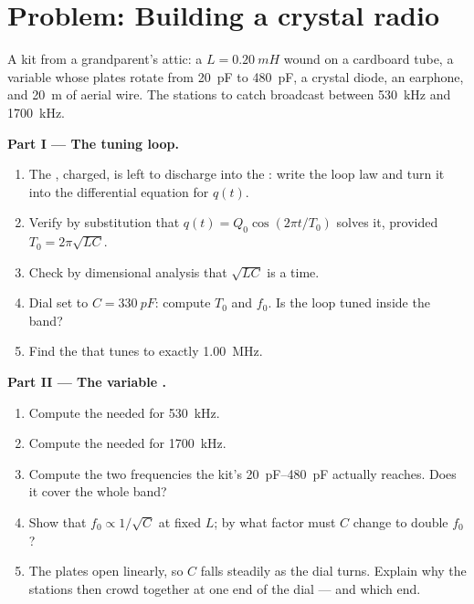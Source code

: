 \section{Problem: Building a crystal radio}

\begin{problem}
\label{pb:g12:rlc-oscillations:1}
A kit from a grandparent's attic: a  $L = \qty{0.20}{mH}$ wound on
a cardboard tube, a variable  whose plates rotate from
\qty{20}{pF} to \qty{480}{pF}, a crystal diode, an earphone, and
\qty{20}{m} of aerial wire. The stations to catch broadcast between
\qty{530}{kHz} and \qty{1700}{kHz}.

\medskip
\noindent\textbf{Part I --- The tuning loop.}
\begin{enumerate}
  \item The , charged, is left to discharge into the :
        write the loop law and turn it into the differential equation
        for $q(t)$.
  \item Verify by substitution that $q(t) = Q_0\cos(2\pi t/T_0)$
        solves it, provided $T_0 = 2\pi\sqrt{LC}$.
  \item Check by dimensional analysis that $\sqrt{LC}$ is a time.
  \item Dial set to $C = \qty{330}{pF}$: compute $T_0$ and $f_0$. Is
        the loop tuned inside the band?
  \item Find the  that tunes to exactly \qty{1.00}{MHz}.
\end{enumerate}

\medskip
\noindent\textbf{Part II --- The variable .}
\begin{enumerate}[resume]
  \item Compute the  needed for \qty{530}{kHz}.
  \item Compute the  needed for \qty{1700}{kHz}.
  \item Compute the two frequencies the kit's \qtyrange{20}{480}{pF}
         actually reaches. Does it cover the whole band?
  \item Show that $f_0 \propto 1/\sqrt{C}$ at fixed $L$; by what
        factor must $C$ change to double $f_0$?
  \item The plates open linearly, so $C$ falls steadily as the dial
        turns. Explain why the stations then crowd together at one end
        of the dial --- and which end.
\end{enumerate}


\end{problem}
